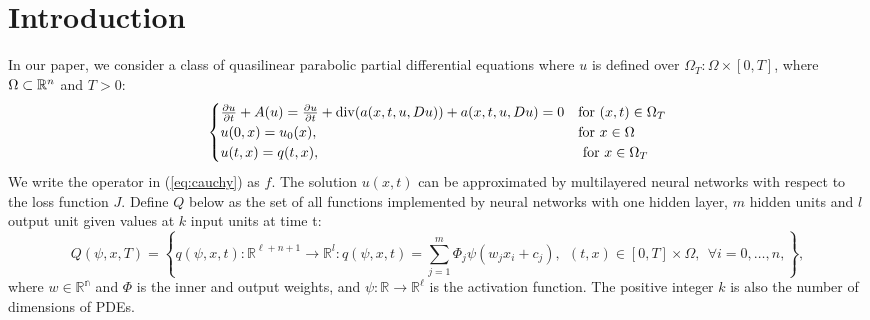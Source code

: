 \documentclass{article}
\begin{document}
	\tableofcontents
	\section{Introduction}

	In our paper, we consider a class of quasilinear parabolic partial differential equations where $u$ is defined over $\Omega_T:\Omega\times [0,T]$, where $\Omega\subset\Bbb R^n$ and $T>0$:
	\begin{equation}
	\begin{cases}
 \frac{\partial u}{\partial t} +A(u) =\frac{\partial u}{\partial t}+{\rm div}(a(x,t,u,Du))+a(x,t,u,Du)=0 & \text{for $(x,t) \in \Omega_{T}$}\\
u(0,x) = u_{0}(x), & \text{for $x \in \Omega$} \\
u(t,x) = q(t,x), & \text{ for $x \in \Omega_{T}$} \\
	\end{cases}
	\label{eq:cauchy}
	\end{equation}
	We write the operator in (\ref{eq:cauchy}) as $f$. The solution $u(x,t)$ can be approximated by multilayered neural networks with respect to the loss function $J$.
Define $Q$ below as the set of all functions implemented by neural networks with one hidden layer, $m$ hidden units and $\textit{l}$ output unit given values at $k$ input units at time t:
	\begin{equation}
	Q(\psi,x,T)=\left \lbrace q(\psi,x,t): \mathbb{R}^{\ell+n+1} \rightarrow \mathbb{R}^{\textit{l}}:
q(\psi,x,t) = \sum_{j=1}^{m}\Phi_{j}\psi(w_{j}x_{i} + c_j ),\  \ (t,x) \in [0,T]\times \Omega, \ \ \forall i = 0, \dots, n ,  \right\rbrace,
	\label{eq:nn}
	\end{equation}
	where $w\in\mathbb{R^n}$ and $\Phi$ is the inner and output weights,
and $\psi:\mathbb{R}\to\mathbb{R^\ell}$ is the activation function.
The positive integer $k$ is also the number of dimensions of PDEs.
\end{document}
